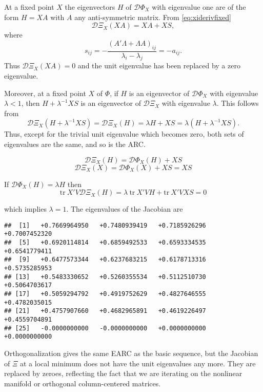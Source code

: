 \documentclass[
  12pt,
]{article}
\begin{document}
At a fixed point \(X\) the eigenvectors \(H\) of \(\mathcal{D}\Phi_X\) with eigenvalue one are of the form \(H=XA\) with \(A\) any anti-symmetric matrix. From \eqref{eq:xiderivfixed}
\begin{equation}
\mathcal{D}\Xi_X(XA)=XA+XS,
\label{eq:xiderivasym}
\end{equation}
where
\begin{equation}
s_{ij}=-\frac{(A'\Lambda+\Lambda A)_{ij}}{\lambda_i-\lambda_j}=-a_{ij}.
\label{eq:sdefasym}
\end{equation}
Thus \(\mathcal{D}\Xi_X(XA)=0\) and the unit eigenvalue has been replaced by a
zero eigenvalue.

Moreover, at a fixed point \(X\) of \(\Phi\), if \(H\) is an eigenvector of \(\mathcal{D}\Phi_X\) with eigenvalue \(\lambda<1\), then \(H+\lambda^{-1}XS\) is an eigenvector of \(\mathcal{D}\Xi_X\) with eigenvalue \(\lambda\). This follows from
\begin{equation}
\mathcal{D}\Xi_X(H+\lambda^{-1}XS)=\mathcal{D}\Xi_X(H)=\lambda H+XS=\lambda(H+\lambda^{-1}XS).
\label{eq:evaltrans}
\end{equation}
Thus, except for the trivial unit eigenvalue which becomes zero, both sets of eigenvalues are the same, and so is the ARC.

\[
\mathcal{D}\Xi_X(H)=\mathcal{D}\Phi_X(H)+XS
\]
\[
\mathcal{D}\Xi_X(X)=\mathcal{D}\Phi_X(X)+XS=XS
\]

If \(\mathcal{D}\Phi_X(H)=\lambda H\) then
\[
\text{tr}\ X'V\mathcal{D}\Xi_X(H)=\lambda\ \text{tr}\ X'VH+\text{tr}\ X'VXS=0
\]

which implies \(\lambda = 1\).
The eigenvalues of the Jacobian are

\begin{verbatim}
##  [1]   +0.7669964950   +0.7480939419   +0.7185926296   +0.7007452320
##  [5]   +0.6920114814   +0.6859492533   +0.6593334535   +0.6541779411
##  [9]   +0.6477573344   +0.6237683215   +0.6178713316   +0.5735285953
## [13]   +0.5483330652   +0.5260355534   +0.5112510730   +0.5064703617
## [17]   +0.5059294792   +0.4919752629   +0.4827646555   +0.4782035015
## [21]   +0.4757907660   +0.4682965891   +0.4619226497   +0.4559704891
## [25]   -0.0000000000   -0.0000000000   +0.0000000000   +0.0000000000
\end{verbatim}

Orthogonalization gives the same
EARC as the basic sequence, but the Jacobian
of \(\Xi\) at a local minimum does not have the unit
eigenvalues any more. They are replaced by zeroes, reflecting
the fact that we are iterating on the nonlinear manifold
or orthogonal column-centered matrices.
\end{document}
